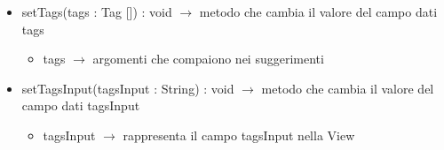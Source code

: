 \begin{description}
\begin{itemize}
	\item setTags(tags : Tag []) : void $\rightarrow$ metodo che cambia il valore del campo dati tags\begin{itemize}
		\item tags $\rightarrow$ argomenti che compaiono nei suggerimenti
	\end{itemize}
	
	\item setTagsInput(tagsInput : String) : void $\rightarrow$ metodo che cambia il valore del campo dati tagsInput\begin{itemize}
		\item tagsInput $\rightarrow$ rappresenta il campo tagsInput nella View
	\end{itemize}
	
\end{itemize}

\end{description}

